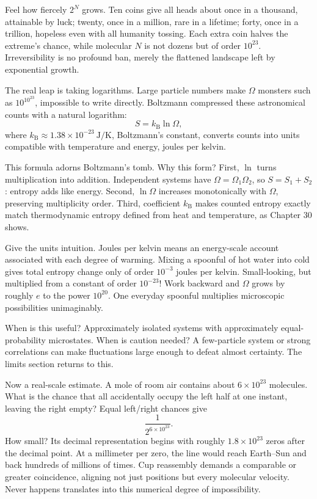 Feel how fiercely \(2^N\) grows. Ten coins give all heads about once in a thousand, attainable by luck; twenty, once in a million, rare in a lifetime; forty, once in a trillion, hopeless even with all humanity tossing. Each extra coin halves the extreme's chance, while molecular \(N\) is not dozens but of order \(10^{23}\). Irreversibility is no profound ban, merely the flattened landscape left by exponential growth.

\begin{mathbridge}
The real leap is taking logarithms. Large particle numbers make \(\Omega\) monsters such as \(10^{10^{23}}\), impossible to write directly. Boltzmann compressed these astronomical counts with a natural logarithm:
\[
S = k_{\mathrm{B}} \ln \Omega,
\]
where \(k_{\mathrm{B}}\approx1.38\times10^{-23}\ \mathrm{J/K}\), Boltzmann's constant, converts counts into units compatible with temperature and energy, joules per kelvin.

This formula adorns Boltzmann's tomb. Why this form? First, \(\ln\) turns multiplication into addition. Independent systems have \(\Omega=\Omega_1\Omega_2\), so \(S=S_1+S_2\): entropy adds like energy. Second, \(\ln\Omega\) increases monotonically with \(\Omega\), preserving multiplicity order. Third, coefficient \(k_{\mathrm{B}}\) makes counted entropy exactly match thermodynamic entropy defined from heat and temperature, as Chapter 30 shows.

Give the units intuition. Joules per kelvin means an energy-scale account associated with each degree of warming. Mixing a spoonful of hot water into cold gives total entropy change only of order \(10^{-3}\) joules per kelvin. Small-looking, but multiplied from a constant of order \(10^{-23}\)! Work backward and \(\Omega\) grows by roughly \(e\) to the power \(10^{20}\). One everyday spoonful multiplies microscopic possibilities unimaginably.

When is this useful? Approximately isolated systems with approximately equal-probability microstates. When is caution needed? A few-particle system or strong correlations can make fluctuations large enough to defeat almost certainty. The limits section returns to this.
\end{mathbridge}

Now a real-scale estimate. A mole of room air contains about \(6\times10^{23}\) molecules. What is the chance that all accidentally occupy the left half at one instant, leaving the right empty? Equal left/right chances give
\[
\frac{1}{2^{6\times10^{23}}}.
\]
How small? Its decimal representation begins with roughly \(1.8\times10^{23}\) zeros after the decimal point. At a millimeter per zero, the line would reach Earth--Sun and back hundreds of millions of times. Cup reassembly demands a comparable or greater coincidence, aligning not just positions but every molecular velocity. Never happens translates into this numerical degree of impossibility.

